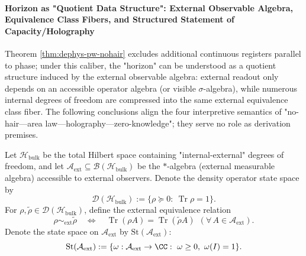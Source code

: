 \paragraph{Horizon as "Quotient Data Structure": External Observable Algebra, Equivalence Class Fibers, and Structured Statement of Capacity/Holography}
Theorem \ref{thm:dephys-pw-nohair} excludes additional continuous registers parallel to phase; under this caliber,
the "horizon" can be understood as a quotient structure induced by the external observable algebra:
external readout only depends on an accessible operator algebra (or visible \(\sigma\)-algebra), while numerous internal degrees of freedom are compressed into the same external equivalence class fiber.
The following conclusions align the four interpretive semantics of "no-hair—area law—holography—zero-knowledge"; they serve no role as derivation premises.

\begin{definition}\label{def:dephys-ext-observable-algebra-equivalence}
Let \(\mathcal{H}_{\mathrm{bulk}}\) be the total Hilbert space containing "internal-external" degrees of freedom, and let
\(\mathcal{A}_{\mathrm{ext}}\subseteq \mathcal{B}(\mathcal{H}_{\mathrm{bulk}})\)
be the \(\ast\)-algebra (external measurable algebra) accessible to external observers.
Denote the density operator state space by
\[
\mathcal{D}(\mathcal{H}_{\mathrm{bulk}})
:=\{\rho\succeq 0:\ \operatorname{Tr}\rho=1\}.
\]
For \(\rho,\tilde\rho\in\mathcal{D}(\mathcal{H}_{\mathrm{bulk}})\), define the external equivalence relation
\begin{equation}\label{eq:dephys-ext-equivalence}
\boxed{\;
\rho\sim_{\mathrm{ext}}\tilde\rho
\quad\Longleftrightarrow\quad
\operatorname{Tr}(\rho A)=\operatorname{Tr}(\tilde\rho A)\ \ (\forall\,A\in\mathcal{A}_{\mathrm{ext}}).\;}
\end{equation}
Denote the state space on \(\mathcal{A}_{\mathrm{ext}}\) by \(\mathrm{St}(\mathcal{A}_{\mathrm{ext}})\):
\[
\mathrm{St}(\mathcal{A}_{\mathrm{ext}})
:=\{\omega:\mathcal{A}_{\mathrm{ext}}\to\CC:\ \omega\ge 0,\ \omega(I)=1\}.
\]
\end{definition}

